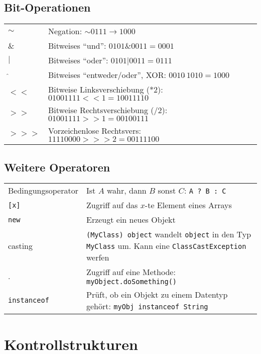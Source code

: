 \subsection{Bit-Operationen}
\settowidth{\MyLenA}{[\texttt{>>>}]~~~}
\begin{tabular}{@{}p{\the\MyLenA}%
				@{}p{(\linewidth - \the\MyLenA)}}
$\sim$ & Negation: $\sim0111 \to 1000$\\
$\&$ & Bitweises \enquote{und}: $0101 \& 0011 = 0001$\\
$|$ & Bitweises \enquote{oder}: $0101 | 0011 = 0111$\\
$\hat\ $ & Bitweises \enquote{entweder/oder}, XOR: $0010 \hat\ 1010 = 1000$\\
$<<$ & Bitweise Linksverschiebung (*2): $01001111 <<  1 = 10011110$\\
$>>$ & Bitweise Rechtsverschiebung (/2): $01001111 >>  1 = 00100111$\\
$>>>$ & Vorzeichenlose Rechtsvers: $11110000 >>> 2 = 00111100$\\
\end{tabular}

\subsection{Weitere Operatoren}
\settowidth{\MyLenA}{[Bedingungsoperator]~~}
\begin{tabular}{@{}p{\the\MyLenA}%
				@{}p{(\linewidth - \the\MyLenA)}}
Bedingungsoperator & Ist $A$ wahr, dann $B$ sonst $C$: \texttt{A ? B : C}\\
\texttt{[x]} & Zugriff auf das $x$-te Element eines Arrays\\
\texttt{new} & Erzeugt ein neues Objekt\\
casting & \texttt{(MyClass) object} wandelt \texttt{object} in den Typ \texttt{MyClass} um. Kann eine \texttt{ClassCastException} werfen\\
. & Zugriff auf eine Methode: \texttt{myObject.doSomething()}\\
\texttt{instanceof} & Prüft, ob ein Objekt zu einem Datentyp gehört: \texttt{myObj instanceof String}\\
\end{tabular}

\section{Kontrollstrukturen}
